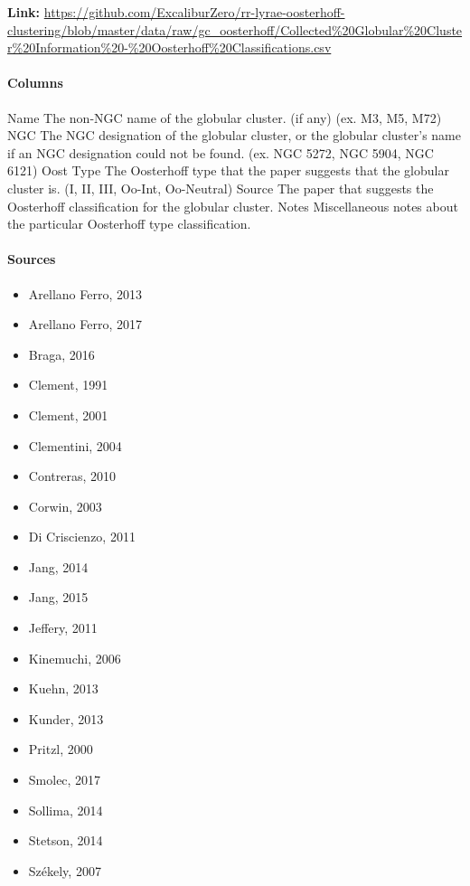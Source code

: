 \documentclass[]{article}
\begin{document}
\vspace{12pt}

\textbf{Link:} \url{https://github.com/ExcaliburZero/rr-lyrae-oosterhoff-clustering/blob/master/data/raw/gc_oosterhoff/Collected\%20Globular\%20Cluster\%20Information\%20-\%20Oosterhoff\%20Classifications.csv}

\paragraph{Columns}

\begin{outline}
	\1 Name
	\2 The non-NGC name of the globular cluster. (if any) (ex. M3, M5, M72)
	\1 NGC
	\2 The NGC designation of the globular cluster, or the globular cluster’s name if an NGC designation could not be found. (ex. NGC 5272, NGC 5904, NGC 6121)
	\1 Oost Type
	\2 The Oosterhoff type that the paper suggests that the globular cluster is. (I, II, III, Oo-Int, Oo-Neutral)
	\1 Source
	\2 The paper that suggests the Oosterhoff classification for the globular cluster.
	\1 Notes
	\2 Miscellaneous notes about the particular Oosterhoff type classification.
\end{outline}

\paragraph{Sources}

\begin{itemize}
	\item Arellano Ferro, 2013 \cite{arellano_ferro_2013}
	\item Arellano Ferro, 2017 \cite{arellano_ferro_2017}
	\item Braga, 2016 \cite{braga_2016}
	\item Clement, 1991 \cite{clement_1991_a}
	\item Clement, 2001 \cite{clement_2001_a}
	\item Clementini, 2004 \cite{clementini_2004}
	\item Contreras, 2010 \cite{contreras_2010}
	\item Corwin, 2003 \cite{corwin_2003}
	\item Di Criscienzo, 2011 \cite{di_criscienzo_2011_a}
	\item Jang, 2014 \cite{jang_2014}
	\item Jang, 2015 \cite{jang_2015}
	\item Jeffery, 2011 \cite{jeffery_2011}
	\item Kinemuchi, 2006 \cite{kinemuchi_2006_a}
	\item Kuehn, 2013 \cite{kuehn_2013}
	\item Kunder, 2013 \cite{kunder_2013_d}
	\item Pritzl, 2000 \cite{pritzl_2000_a}
	\item Smolec, 2017 \cite{smolec_2017}
	\item Sollima, 2014 \cite{sollima_2014}
	\item Stetson, 2014 \cite{stetson_2014}
	\item Székely, 2007 \cite{szekely_2007}
\end{itemize}
\end{document}

